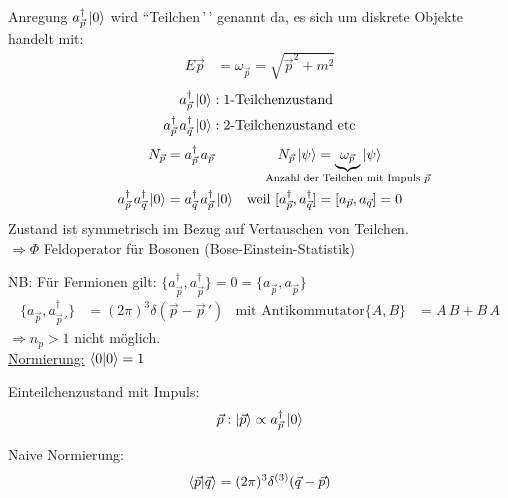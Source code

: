 Anregung $a_{\vec{p}}^\dagger \ket{0}$ wird ``Teilchen\,'\,' genannt da, es sich um diskrete Objekte handelt mit: 
	\begin{align*}
		E \vec{p} &= \omega_{\vec{p}} = \sqrt{\vec{p}^2 + m^2} 
	\end{align*}
	\begin{align*}
		a_{\vec{p}}^\dagger \ket{0} &: \text{1-Teilchenzustand} \\
		a_{\vec{p}}^\dagger\, a_{\vec{q}}^\dagger \ket{0} &: \text{2-Teilchenzustand etc}
	\end{align*}
	\begin{align*}
		N_{\vec{p}} &= a_{\vec{p}}^\dagger \,a_{\vec{p}} & 
		N_{\vec{p}} \ket{\psi} &= \underbrace{\omega_{\vec{p}}}_{\mathclap{\text{Anzahl der Teilchen mit Impuls }\vec{p}}} \ket{\psi} \\
		a_{\vec{p}}^\dagger\, a_{\vec{q}}^\dagger \ket{0} &= a_{\vec{q}}^\dagger\, a_{\vec{p}}^\dagger \ket{0} &
		\text{weil } [a_{\vec{p}}^\dagger, a_{\vec{q}}^\dagger] &= [a_{\vec{p}}, a_{\vec{q}}] = 0
	\end{align*}
Zustand ist symmetrisch im Bezug auf Vertauschen von Teilchen. 
\\
$\Rightarrow \Phi$ Feldoperator für Bosonen (Bose-Einstein-Statistik) 

NB: Für Fermionen gilt: $ \{a_{\vec{p}}^\dagger, a_{\vec{p}}^\dagger\} = 0 = \{a_{\vec{p}}, a_{\vec{p}}\}$ 
	\begin{align*}
		\{a_{\vec{p}}, a_{\vec{p}\,'}^\dagger\} &= (2 \pi)^3 \delta (\vec{p} - \vec{p}\,') 
		& \text{mit Antikommutator} \{A, B\} &= A\, B + B\, A
	\end{align*}
$\Rightarrow n_p > 1$ nicht möglich.
\\
\underline{Normierung:} $\braket{0 | 0} = 1$ 

Einteilchenzustand mit Impuls: %
	\begin{align*}
		\vec{p} : \ket{\vec{p}} \propto a_{\vec{p}}^\dagger \ket{0}
	\end{align*}

Naive Normierung: %
	\begin{align*}
		\braket{\vec{p} | \vec{q}} = (2 \pi)^3 \delta^{(3)}(\vec{q} - \vec{p})
	\end{align*}

